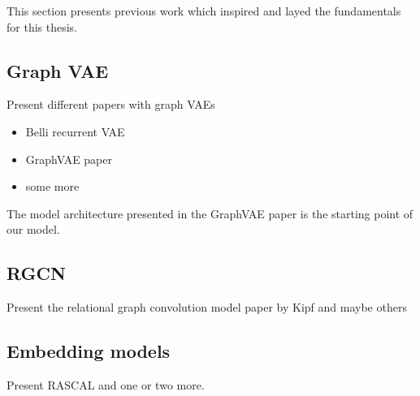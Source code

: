 This section presents previous work which inspired and layed the fundamentals for this thesis.

\subsection{Graph VAE}

Present different papers with graph VAEs

\begin{itemize}
    \item Belli recurrent VAE
    \item GraphVAE paper
    \item some more
\end{itemize}

The model architecture presented in the GraphVAE paper is the starting point of our model.

\subsection{RGCN}

Present the relational graph convolution model paper by Kipf and maybe others

\subsection{Embedding models}

Present RASCAL and one or two more.
